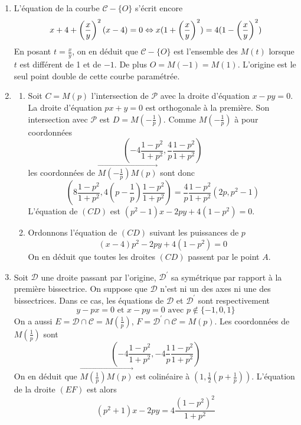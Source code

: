 \begin{enumerate}
\item  L'{\'e}quation de la courbe $\mathcal{C}-\{O\}$ s'{\'e}crit encore
\[
x+4+\left( \frac{x}{y}\right) ^{2}(x-4)=0\Leftrightarrow x(1+\left( \frac{x}{%
y}\right) ^{2})=4(1-\left( \frac{x}{y}\right) ^{2})
\]
En posant $t=\frac{x}{y}$, on en d{\'e}duit que $\mathcal{C}-\{O\}$
est l'ensemble des $M(t)$ lorsque $t$ est diff{\'e}rent de 1 et de
$-1$. De plus $O=M(-1)=M(1)$. L'origine est le seul point double
de cette courbe param{\'e}tr{\'e}e.
\item \begin{enumerate}
 \item Soit $C=M(p)$ l'intersection de $\mathcal{P}$ avec la droite d'{\'e}quation $x-py=0$. La droite
d'{\'e}quation $px+y=0$ est orthogonale {\`a} la premi{\`e}re. Son intersection avec $\mathcal{P}$ est $D=M(-\frac{1}{p})$. Comme $M(-\frac{1}{p})$ {\`a} pour coordonn{\'e}es
\[
(-4\frac{1-p^{2}}{1+p^{2}},\frac{4}{p}\frac{1-p^{2}}{1+p^{2}})
\]
les coordonn{\'e}es de $\overrightarrow{M(-\frac{1}{p})M(p)}$ sont donc
\[
(8\frac{1-p^{2}}{1+p^{2}},4(p-\frac{1}{p})\frac{1-p^{2}}{1+p^{2}})=\frac{4}{p%
}\frac{1-p^{2}}{1+p^{2}}(2p,p^{2}-1)
\]
L'{\'e}quation de $(CD)$ est $(p^{2}-1)x-2py+4(1-p^{2})=0$.

\item  Ordonnons l'{\'e}quation de $(CD)$  suivant les puissances de $p$ 
\[
(x-4)p^{2}-2py+4(1-p^{2})=0
\]
On en d{\'e}duit que toutes les droites $(CD)$ passent par le point $A$.
\end{enumerate}
\item Soit $\mathcal{D}$ une droite passant par l'origine, $\mathcal{D}^{\prime }$ sa sym{\'e}trique par rapport {\`a} la premi{\`e}re bissectrice.\newline
On suppose que $\mathcal{D}$ n'est ni un des axes ni une des bissectrices. Dans ce cas, les {\'e}quations de $\mathcal{D}$ et $\mathcal{D}^{\prime }$ sont respectivement 
\begin{displaymath}
 y-px=0 \text{ et } x-py=0 \text{ avec } p\notin \{-1,0,1\}
\end{displaymath}
On a aussi $E=\mathcal{D}\cap \mathcal{C}=M(\frac{1}{p})$, $F=\mathcal{D}^{\prime }\cap \mathcal{C}=M(p)$. Les coordonn{\'e}es de $M(\frac{1}{p})$ sont
\[
(-4\frac{1-p^{2}}{1+p^{2}},-4\frac{1}{p}\frac{1-p^{2}}{1+p^{2}})
\]
On en d{\'e}duit que $\overrightarrow{M(\frac{1}{p})M(p)}$ est colin{\'e}aire {\`a} $(1,\frac{1}{2}(p+\frac{1}{p}))$. L'{\'e}quation de la droite $(EF)$ est alors
\[
(p^{2}+1)x-2py=4\frac{(1-p^{2})^{2}}{1+p^{2}}
\] 

\end{enumerate}
